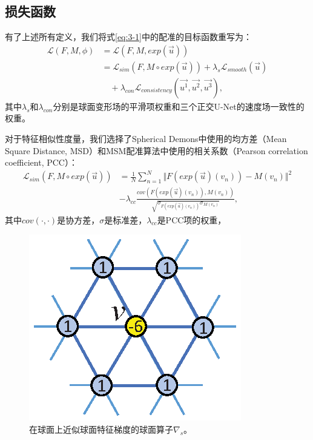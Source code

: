 \subsection{损失函数}\label{sec:s3reg配准网络的损失函数}
有了上述所有定义，我们将式\ref{eq:3-1}中的配准的目标函数重写为：
\begin{equation}
\begin{split}
{\mathcal{L}}(F,M,\phi) & = {\mathcal{L}}(F,M,exp(\overrightarrow{u})) \\
& = {\mathcal{L}}_{sim}(F,M\circ exp(\overrightarrow{u})) + \lambda_s {\mathcal{L}}_{smooth}(\overrightarrow{u}) \\
& \quad + \lambda_{con} {\mathcal{L}}_{consistency}(\overrightarrow{u^1}, \overrightarrow{u^2}, \overrightarrow{u^3}),
\end{split}
\end{equation}
其中$\lambda_s$和$\lambda_{con}$分别是球面变形场的平滑项权重和三个正交U-Net的速度场一致性的权重。

对于特征相似性度量，我们选择了Spherical Demons中使用的均方差（Mean Square Distance, MSD）\cite{yeo2009spherical}和MSM配准算法\cite{robinson2014msm}中使用的相关系数（Pearson correlation coefficient, PCC）：
\begin{equation}
	\begin{split}
	{\mathcal{L}}_{sim}(F,M\circ exp(\overrightarrow{u})) & = \frac{1}{N} \sum_{n=1}^{N} \Vert F(exp(\overrightarrow{u})(v_n)) - M(v_n) \Vert ^2 \\
	& - \lambda_{cc} \frac{cov(F(exp(\overrightarrow{u})(v_n)), M(v_n))}{\sqrt{\sigma_{ F(exp(\overrightarrow{u})(v_n))} \sigma_{M(v_n)}}} , 
	\end{split}
\end{equation}
其中$cov(\cdot,\cdot)$是协方差，$\sigma$是标准差，$\lambda_{cc}$是PCC项的权重，

\begin{figure}[t]
	\centering
	\includegraphics[width=0.35\columnwidth]{figure/gradient_kernel.eps}
	\caption{在球面上近似球面特征梯度的球面算子$\nabla_s$。}
	\label{fig:gradient_kernel}
\end{figure}

